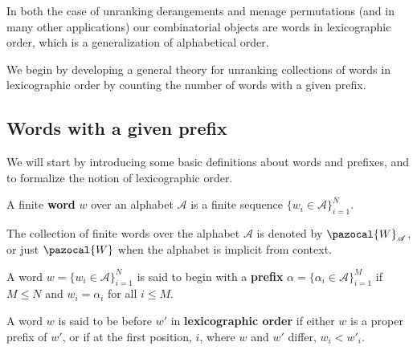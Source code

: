 In both the case of unranking derangements and menage permutations
(and in many other applications) our combinatorial objects are
words in lexicographic order, which is a generalization of alphabetical order.

We begin by developing a general theory for unranking collections of words in
lexicographic order by counting the number of words with a given prefix.
\subsection{Words with a given prefix}

We will start by introducing some basic definitions about words and prefixes,
and to formalize the notion of lexicographic order.

\begin{definition}
  A finite \textbf{word} $w$ over an alphabet $\mathcal A$ is a finite sequence
  $\{w_i \in \mathcal A\}_{i=1}^N$.

  The collection of finite words over the alphabet $\mathcal A$ is denoted by
  $\pazocal{W}_\mathcal{A}$, or just $\pazocal{W}$ when the alphabet is
  implicit from context.
\end{definition}

\begin{definition}
  A word $w = \{w_i \in \mathcal A\}_{i=1}^N$ is said to begin with a
  \textbf{prefix} $\alpha = \{\alpha_i \in \mathcal A\}_{i=1}^M$ if
  $M \leq N$ and $w_i = \alpha_i$ for all $i \leq M$.
\end{definition}

\begin{definition}
  A word $w$ is said to be before $w'$ in \textbf{lexicographic order}
  if either $w$ is a proper prefix of $w'$, or if at the first position, $i$,
  where $w$ and $w'$ differ, $w_i < w'_i$.
  \label{def:lexicographicOrder}
\end{definition}

